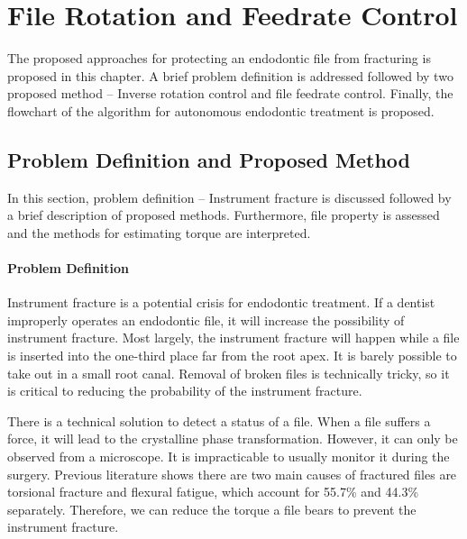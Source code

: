 \chapter{File Rotation and Feedrate Control}
\label{chapter5}
The proposed approaches for protecting an endodontic file from fracturing is proposed in this chapter. A brief problem definition is addressed followed by two proposed method -- Inverse rotation control and file feedrate control. Finally, the flowchart of the algorithm for autonomous endodontic treatment is proposed.
\section{Problem Definition and Proposed Method}
\hspace*{6mm}In this section, problem definition -- Instrument fracture is discussed followed by a brief description of proposed methods. Furthermore, file property is assessed and the methods for estimating torque are interpreted.
\subsubsection{Problem Definition}
\hspace*{6mm}Instrument fracture is a potential crisis for endodontic treatment. If a dentist improperly operates an endodontic file, it will increase the possibility of instrument fracture. Most largely, the instrument fracture will happen while a file is inserted into the one-third place far from the root apex. It is barely possible to take out in a small root canal. Removal of broken files is technically tricky, so it is critical to reducing the probability of the instrument fracture.
\par

There is a technical solution to detect a status of a file. When a file suffers a force, it will lead to the crystalline phase transformation. However, it can only be observed from a microscope. It is impracticable to usually monitor it during the surgery. Previous literature shows there are two main causes of fractured files are torsional fracture and flexural fatigue, which account for 55.7\% and 44.3\% separately\cite{SATTAPAN2000161}. Therefore, we can reduce the torque a file bears to prevent the instrument fracture.
